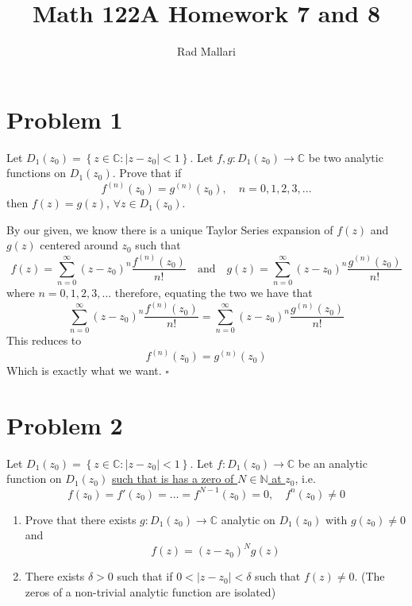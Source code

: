 \documentclass[11pt]{article}
\title{Math 122A Homework 7 and 8}
\author{Rad Mallari}
\newcommand{\N}{\mathbb{N}}
\newcommand{\C}{\mathbb{C}}
\newcommand{\set}[1]{\left\{ #1\right\}}
\newenvironment{proof}{\noindent{\bf Proof.}}{\hfill $\square$\medskip}
\begin{document}
\maketitle


\section{Problem 1}
Let $D_{1}(z_{0})=\set{z\in\C:|z-z_{0}|<1}$. Let $f,g:D_{1}(z_{0})\to\C$ be two analytic functions on $D_{1}(z_{0})$. Prove that if
$$f^{(n)}(z_{0})=g^{(n)}(z_{0}),\quad n=0,1,2,3,...$$
then $f(z)=g(z)$, $\forall z\in D_{1}(z_{0})$.

\begin{proof}
    By our given, we know there is a unique Taylor Series expansion of $f(z)$ and $g(z)$ centered around $z_{0}$ such that
    $$f(z)=\sum_{n=0}^{\infty}(z-z_{0})^{n}\frac{f^{(n)}(z_{0})}{n!} \quad\text{and}\quad g(z)=\sum_{n=0}^{\infty}(z-z_{0})^{n}\frac{g^{(n)}(z_{0})}{n!}$$
    where $n=0,1,2,3,...$ therefore, equating the two we have that
    $$\sum_{n=0}^{\infty}(z-z_{0})^{n}\frac{f^{(n)}(z_{0})}{n!}=\sum_{n=0}^{\infty}(z-z_{0})^{n}\frac{g^{(n)}(z_{0})}{n!}$$
    This reduces to
    $$f^{(n)}(z_{0})=g^{(n)}(z_{0})$$
    Which is exactly what we want.
\end{proof}


\newpage
\section{Problem 2}
Let $D_{1}(z_{0})=\set{z\in\C:|z-z_{0}|<1}$. Let $f:D_{1}(z_{0})\to\C$ be an analytic function on $D_{1}(z_{0})$ \underline{such that is has a zero of $N\in\N$ at $z_{0}$}, i.e.
$$f(z_{0})=f'(z_{0})=...=f^{N-1}(z_{0})=0,\quad f^{n}(z_{0})\neq0$$
\begin{enumerate}[label=\textbf{(\roman*)}]
    \item Prove that there exists $g:D_{1}(z_{0})\to\C$ analytic on $D_{1}(z_{0})$ with $g(z_{0})\neq0$ and
          $$f(z)=(z-z_{0})^{N}g(z)$$
    \item There exists $\delta>0$ such that if $0<|z-z_{0}|<\delta$ such that $f(z)\neq0$. (The zeros of a non-trivial analytic function are isolated)
\end{enumerate}
\end{document}
